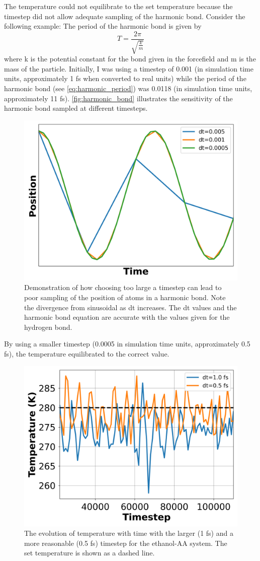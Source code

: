 The temperature could not equilibrate to the set temperature because the timestep did not allow adequate sampling of the harmonic bond.
Consider the following example:
The period of the harmonic bond is given by
\begin{equation}\label{eq:harmonic_period}
    T = \frac{2\pi}{\sqrt{\frac{k}{m}}}
\end{equation}
where k is the potential constant for the bond given in the forcefield and m is the mass of the particle.
Initially, I was using a timestep of 0.001 (in simulation time units, approximately 1 fs when converted to real units) while the period of the harmonic bond (see \autoref{eq:harmonic_period}) was 0.0118 (in simulation time units, approximately 11 fs). \autoref{fig:harmonic_bond} illustrates the sensitivity of the harmonic bond sampled at different timesteps.
\begin{figure}[h!]
    \centering
    \includegraphics[width=0.6\linewidth,keepaspectratio]{figures/rep_study/harmonic_bond.png}
    \caption{Demonstration of how choosing too large a timestep can lead to poor sampling of the position of atoms in a harmonic bond. Note the divergence from sinusoidal as dt increases. The dt values and the harmonic bond equation are accurate with the values given for the hydrogen bond.}\label{fig:harmonic_bond}
\end{figure}
By using a smaller timestep (0.0005 in simulation time units, approximately 0.5 fs), the temperature equilibrated to the correct value.
\begin{figure}[h!]
    \centering
    \includegraphics[width=0.6\linewidth,keepaspectratio]{figures/rep_study/temp_evolution.png}
    \caption{The evolution of temperature with time with the larger (1 fs) and a more reasonable (0.5 fs) timestep for the ethanol-AA system. The set temperature is shown as a dashed line. }\label{fig:temp_evo_ethanol}
\end{figure}
